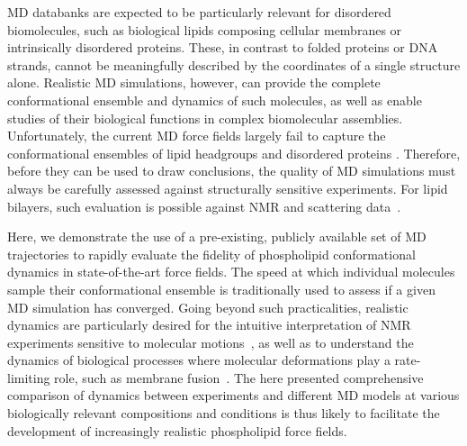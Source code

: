 \documentclass[journal=jcisd8,manuscript=article,layout=twocolumn]{achemso}
\begin{document}
MD databanks are expected to be particularly relevant for disordered biomolecules, such as
biological lipids composing cellular membranes or intrinsically disordered proteins.
These, in contrast to folded proteins or DNA strands,
cannot be meaningfully described by the coordinates of a single structure alone.
Realistic MD simulations, however,
can provide the complete conformational ensemble and dynamics of such molecules, as well as
enable studies of their biological functions in complex biomolecular assemblies.
Unfortunately, the current MD force fields largely fail to capture the conformational ensembles of lipid headgroups and
disordered proteins \cite{botan15,Antila:2019a,robustelli18,henriques18,virtanen20}.
Therefore, before they can be used to draw conclusions,
the quality of MD simulations
must always be carefully assessed against structurally sensitive experiments.
For lipid bilayers, such evaluation is possible against NMR and scattering data~\cite{Ollila:2016a}.

Here, we demonstrate the use of a pre-existing, publicly available set of MD trajectories to
rapidly evaluate the fidelity of phospholipid conformational dynamics in state-of-the-art force fields.
The speed at which individual molecules sample their conformational ensemble
is traditionally used to assess if a given MD simulation has converged.
Going beyond such practicalities,
realistic dynamics are particularly desired for the intuitive interpretation of NMR %
experiments sensitive to molecular motions~\cite{Antila:2020a},
as well as to understand the dynamics of biological processes where
molecular deformations play a rate-limiting role, such as membrane fusion~\cite{han17}.
%
%
The here presented comprehensive comparison of dynamics between experiments and different MD models %
at various biologically relevant compositions and conditions is thus likely to facilitate the development of increasingly realistic phospholipid force fields. 
\end{document}
